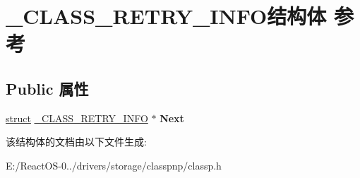 \hypertarget{struct___c_l_a_s_s___r_e_t_r_y___i_n_f_o}{}\section{\+\_\+\+C\+L\+A\+S\+S\+\_\+\+R\+E\+T\+R\+Y\+\_\+\+I\+N\+F\+O结构体 参考}
\label{struct___c_l_a_s_s___r_e_t_r_y___i_n_f_o}
\subsection*{Public 属性}
\begin{DoxyCompactItemize}
\item 
\mbox{\label{struct___c_l_a_s_s___r_e_t_r_y___i_n_f_o_ae9d45e1e7b82996e4c8834d3410d5167}} 
\hyperlink{interfacestruct}{struct} \hyperlink{struct___c_l_a_s_s___r_e_t_r_y___i_n_f_o}{\+\_\+\+C\+L\+A\+S\+S\+\_\+\+R\+E\+T\+R\+Y\+\_\+\+I\+N\+FO} $\ast$ {\bfseries Next}
\end{DoxyCompactItemize}


该结构体的文档由以下文件生成\+:\begin{DoxyCompactItemize}
\item 
E\+:/\+React\+O\+S-\/0../drivers/storage/classpnp/classp.\+h\end{DoxyCompactItemize}
